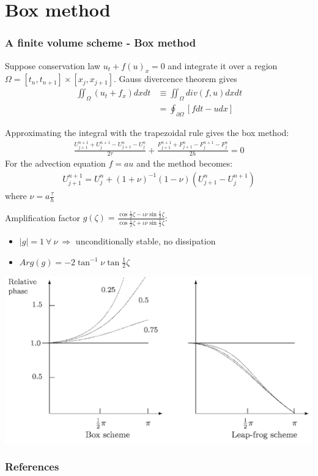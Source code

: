 \documentclass{beamer}
\begin{document}
\section{Box method}
\begin{frame}
\frametitle{A finite volume scheme - Box method}
Suppose conservation law $u_t + f(u)_x = 0$ and integrate it over a region $\Omega = [t_n,t_{n+1}] \times [x_j,x_{j+1}]$. Gauss divercence theorem gives
\begin{align*}
\iint_\Omega(u_t + f_x)dxdt & \equiv \iint_\Omega div(f,u)dxdt \\
& = \oint_{\partial\Omega}[fdt-udx]
\end{align*}
\end{frame}
\begin{frame}
Approximating the integral with the trapezoidal rule gives the box method:
\begin{align*}
\frac{U_{j+1}^{n+1} + U_j^{n+1} - U_{j + 1}^n - U_j^n}{2\tau} + \frac{F_{j+1}^{n+1} + F_{j+1}^n - F_j^{n+1} - F_j^n}{2h} = 0
\end{align*}
For the advection equation $f = au$ and the method becomes:
\begin{align*}
U_{j+1}^{n+1} = U_j^n + (1 + \nu)^{-1}(1 - \nu)(U_{j+1}^n - U_j^{n+1})
\end{align*}
where  $\nu =  a\frac{\tau}{h}$
\end{frame}
\begin{frame}
Amplification factor $g(\zeta) = \displaystyle{\frac{\cos{\frac{1}{2}\zeta} - \iota\nu\sin{\frac{1}{2}\zeta}}{\cos{\frac{1}{2}\zeta} + \iota\nu\sin{\frac{1}{2}\zeta}}}$:
\begin{itemize}
\setlength\itemsep{1em}
\item $|g| = 1 \ \forall \ \nu \ \Rightarrow$ unconditionally stable, no dissipation
\item $Arg(g) = -2\tan^{-1}{\nu\tan{\frac{1}{2}\zeta}}$
\end{itemize}
\end{frame}
\begin{frame}
\cite{morton1994numerical}
\includegraphics[width=\textwidth]{lp_bx_lag}
\end{frame}
\begin{frame}
\frametitle{References}


\end{frame}
\end{document}
